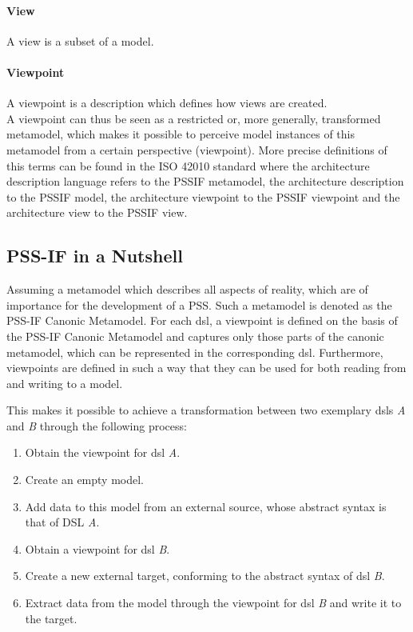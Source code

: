 \paragraph{View} A view is a subset of a model.

\paragraph{Viewpoint} A viewpoint is a description which defines how views are created.\\

A viewpoint can thus be seen as a restricted or, more generally, transformed metamodel, which makes it possible to perceive model instances of this metamodel from a certain perspective (viewpoint). More precise definitions of this terms can be found in the ISO 42010 \cite{ref:42010} standard where the architecture description language refers to the \gls{PSSIF} metamodel, the architecture description to the \gls{PSSIF} model, the architecture viewpoint to the \gls{PSSIF} viewpoint and the architecture view to the \gls{PSSIF} view.

\subsection{PSS-IF in a Nutshell}
\label{sec:approach:pssif:nutshell}

Assuming a metamodel which describes all aspects of reality, which are of importance for the development of a \gls{PSS}. Such a metamodel is denoted as the PSS-IF Canonic Metamodel. For each \gls{dsl}, a viewpoint is defined on the basis of the PSS-IF Canonic Metamodel and captures only those parts of the canonic metamodel, which can be represented in the corresponding \gls{dsl}. Furthermore, viewpoints are defined in such a way that they can be used for both reading from and writing to a model.

This makes it possible to achieve a transformation between two exemplary \glspl{dsl} \textit{A} and \textit{B} through the following process:

\begin{enumerate}
\item Obtain the viewpoint for \gls{dsl} \textit{A}.
\item Create an empty model.
\item Add data to this model from an external source, whose abstract syntax is that of DSL \textit{A}.
\item Obtain a viewpoint for \gls{dsl} \textit{B}.
\item Create a new external target, conforming to the abstract syntax of \gls{dsl} \textit{B}.
\item Extract data from the model through the viewpoint for \gls{dsl} \textit{B} and write it to the target.
\end{enumerate}

